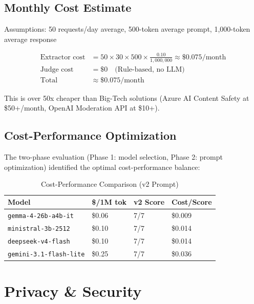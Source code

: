 \documentclass[11pt,a4paper]{article}
\begin{document}
\subsection{Monthly Cost Estimate}

Assumptions: 50 requests/day average, 500-token average prompt, 1,000-token average response

\begin{align*}
\text{Extractor cost} &= 50 \times 30 \times 500 \times \frac{0.10}{1{,}000{,}000} \approx \$0.075/\text{month} \\
\text{Judge cost} &= \$0 \quad \text{(Rule-based, no LLM)} \\
\text{Total} &\approx \$0.075/\text{month}
\end{align*}

This is over 50x cheaper than Big-Tech solutions (Azure AI Content Safety at \$50+/month, OpenAI Moderation API at \$10+).

\subsection{Cost-Performance Optimization}

The two-phase evaluation (Phase 1: model selection, Phase 2: prompt optimization) identified the optimal cost-performance balance:

\begin{table}[h]
\centering
\begin{tabular}{@{}llll@{}}
\toprule
Model & \$/1M tok & v2 Score & Cost/Score \\
\midrule
\texttt{gemma-4-26b-a4b-it} & \$0.06 & 7/7 & \$0.009 \\
\texttt{ministral-3b-2512} & \$0.10 & 7/7 & \$0.014 \\
\texttt{deepseek-v4-flash} & \$0.10 & 7/7 & \$0.014 \\
\texttt{gemini-3.1-flash-lite} & \$0.25 & 7/7 & \$0.036 \\
\bottomrule
\end{tabular}
\caption{Cost-Performance Comparison (v2 Prompt)}
\end{table}

\section{Privacy \& Security}
\end{document}
